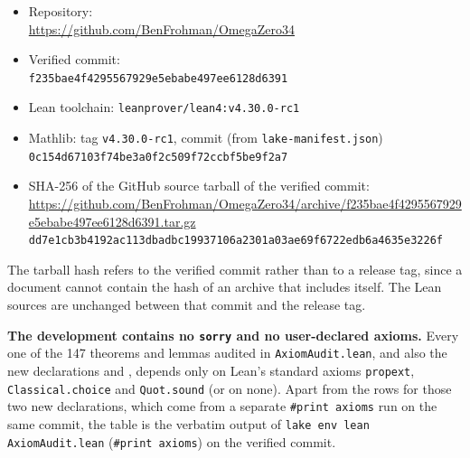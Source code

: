 \documentclass[11pt,a4paper]{article}
\theoremstyle{definition}
\theoremstyle{remark}
\begin{document}
{\raggedright
\begin{itemize}
\item Repository:\\ {\footnotesize\url{https://github.com/BenFrohman/OmegaZero34}}
\item Verified commit:\\ {\footnotesize\texttt{f235bae4f4295567929e5ebabe497ee6128d6391}}
\item Lean toolchain: \texttt{leanprover/lean4:v4.30.0-rc1}
\item Mathlib: tag \texttt{v4.30.0-rc1}, commit (from \texttt{lake-manifest.json})\\ {\footnotesize\texttt{0c154d67103f74be3a0f2c509f72ccbf5be9f2a7}}
\item SHA-256 of the GitHub source tarball of the verified commit:\\ {\footnotesize\url{https://github.com/BenFrohman/OmegaZero34/archive/f235bae4f4295567929e5ebabe497ee6128d6391.tar.gz}}\\
{\footnotesize\texttt{dd7e1cb3b4192ac113dbadbc19937106a2301a03ae69f6722edb6a4635e3226f}}
\end{itemize}\par}

The tarball hash refers to the verified commit rather than to a release tag, since a document cannot contain the hash of an archive that includes itself. The Lean sources are unchanged between that commit and the release tag.

\textbf{The development contains no \texttt{sorry} and no user-declared axioms.} Every one of the 147 theorems and lemmas audited in \texttt{AxiomAudit.lean}, and also the new declarations  and , depends only on Lean's standard axioms \texttt{propext}, \texttt{Classical.choice} and \texttt{Quot.sound} (or on none). Apart from the rows for those two new declarations, which come from a separate \texttt{\#print axioms} run on the same commit, the table is the verbatim output of \texttt{lake env lean AxiomAudit.lean} (\texttt{\#print axioms}) on the verified commit.
\end{document}
